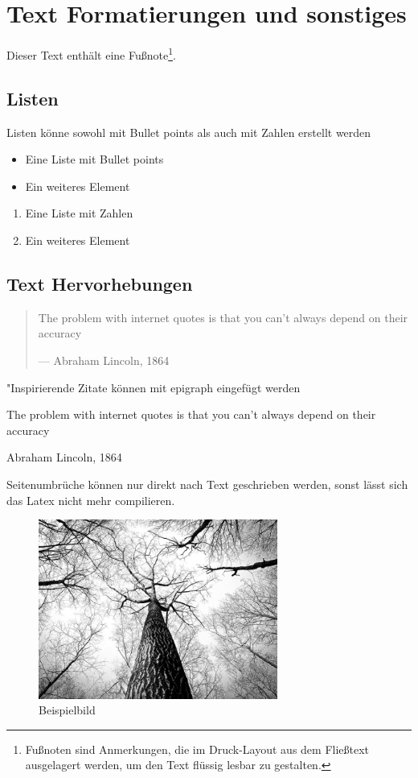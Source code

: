 \section{Text Formatierungen und sonstiges}
Dieser Text enthält eine Fußnote\footnote{Fußnoten sind Anmerkungen, die im Druck-Layout aus dem Fließtext ausgelagert werden, um den Text flüssig lesbar zu gestalten.}.

\subsection{Listen}
Listen könne sowohl mit Bullet points als auch mit Zahlen erstellt werden
\begin{itemize}
	\item Eine Liste mit Bullet points
	\item Ein weiteres Element
\end{itemize}

\begin{enumerate}
	\item Eine Liste mit Zahlen
	\item Ein weiteres Element
\end{enumerate}

\subsection{Text Hervorhebungen}
\begin{quote}
	The problem with internet quotes is that you can't always depend on their accuracy \par\raggedleft--- \textup{Abraham Lincoln, 1864}
\end{quote}

"Inspirierende Zitate können mit epigraph eingefügt werden
\epigraph{The problem with internet quotes is that you can't always depend on their accuracy}{Abraham Lincoln, 1864}

Seitenumbrüche können nur direkt nach Text geschrieben werden, sonst lässt sich das Latex nicht mehr compilieren.
\\

\begin{figure}[H]
	\centering
	\includegraphics[width=0.7\textwidth]{resources/example}
	\caption{Beispielbild {\cite{PEXELS2015}}}
	\label{img:beispielbild}
\end{figure}

